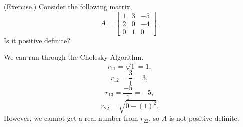 \documentclass[letterpaper]{article}
\newcommand{\0}{\mathbf{0}}
\begin{document}
\begin{mdframed}
    (Exercise.) Consider the following matrix, 
    \[A = \begin{bmatrix}
        1 & 3 & -5 \\ 
        2 & 0 & -4 \\ 
        0 & 1 & 0
    \end{bmatrix}.\] Is it positive definite? 

    \begin{mdframed}
        We can run through the Cholesky Algorithm. 
        \[r_{11} = \sqrt{1} = 1,\]
        \[r_{12} = \frac{3}{1} = 3,\]
        \[r_{13} = \frac{-5}{1} = -5,\]
        \[r_{22} = \sqrt{0 - (1)^2}.\]
        However, we cannot get a real number from $r_{22}$, so $A$ is not positive definite. 
    \end{mdframed}
\end{mdframed}
\end{document}
